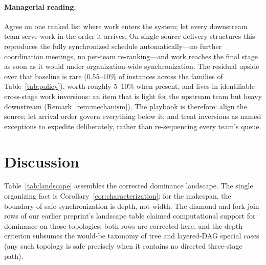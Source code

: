 \documentclass[sn-mathphys,NameDate]{sn-jnl}
\theoremstyle{thmstyleone}
\theoremstyle{thmstylethree}
\theoremstyle{thmstyletwo}
\begin{document}
\paragraph{Managerial reading.}
Agree on one ranked list where work enters the system; let
every downstream team serve work in the order it arrives.
On single-source delivery structures this reproduces the
fully synchronized schedule automatically---no further
coordination meetings, no per-team re-ranking---and work
reaches the final stage as soon as it would under
organization-wide synchronization. The residual upside over
that baseline is rare ($0.55$--$10\%$ of instances across the
families of Table~\ref{tab:policy}), worth roughly
$5$--$10\%$ when present, and lives in identifiable
cross-stage work inversions: an item that is light for the
upstream team but heavy downstream
(Remark~\ref{rem:mechanism}). The playbook is therefore:
align the source; let arrival order govern everything below
it; and treat inversions as named exceptions to expedite
deliberately, rather than re-sequencing every team's queue.

\section{Discussion}
\label{sec:discussion}

Table~\ref{tab:landscape} assembles the corrected dominance
landscape. The single organizing fact is
Corollary~\ref{cor:characterization}: for the makespan, the
boundary of safe synchronization is depth, not width. The
diamond and fork-join rows of our earlier preprint's landscape
table claimed computational support for dominance on those
topologies; both rows are corrected here, and the depth
criterion subsumes the would-be taxonomy of tree and
layered-DAG special cases (any such topology is safe precisely
when it contains no directed three-stage path).
\end{document}
